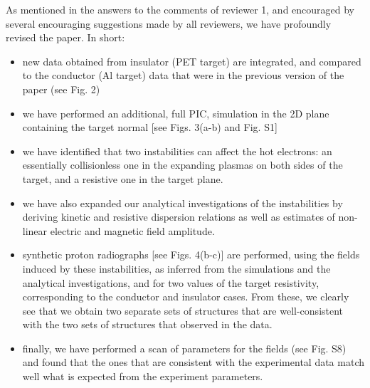 \documentclass{article}
\begin{document}
\begin{enumerate}
As mentioned in the answers to the comments of reviewer 1, and encouraged by several encouraging suggestions made by all reviewers, we have profoundly revised the paper. In short:
\begin{itemize}
    \item new data obtained from insulator (PET target) are integrated, and compared to the conductor (Al target) data that were in the previous version of the paper (see Fig. 2)
    \item we have performed an additional, full PIC, simulation in the 2D plane containing the target normal [see Figs. 3(a-b) and Fig. S1]
    \item we have identified that two instabilities can affect the hot electrons: an essentially  collisionless one in the expanding plasmas on both sides of the target, and a resistive one in the target plane. 
    \item we have also expanded our analytical investigations of the instabilities by deriving kinetic and resistive dispersion relations as well as  estimates of    non-linear electric and magnetic field amplitude.
    \item synthetic proton radiographs [see Figs. 4(b-c)] are performed, using the fields induced by these instabilities, as inferred from the simulations and the analytical investigations, and for two values of the target resistivity, corresponding to the conductor and insulator cases. From these, we clearly see that we obtain two separate sets of structures that are well-consistent with the two sets of structures that observed in the data. 
    \item finally, we have performed a scan of parameters for the fields (see Fig. S8) and found that the ones that are consistent with the experimental data match well what is expected from the experiment parameters. 
\end{itemize}


\end{enumerate}
\end{document}
